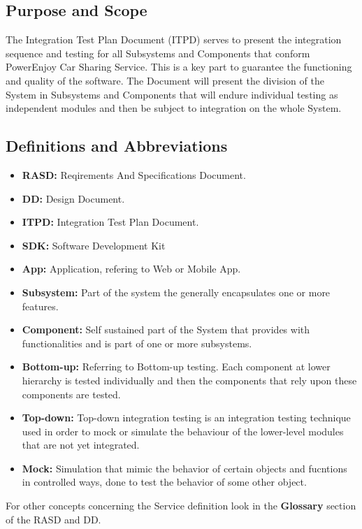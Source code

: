 \documentclass[a4paper]{article}
\begin{document}
\subsection{Purpose and Scope}
The Integration Test Plan Document (ITPD) serves to present the integration sequence and testing for all Subsystems and Components that conform PowerEnjoy Car Sharing Service. This is a key part to guarantee the functioning and quality of the software. The Document will present the division of the System in Subsystems and Components that will endure individual testing as independent modules and then be subject to integration on the whole System.

\subsection{Definitions and Abbreviations}
\begin{itemize}
\item \textbf{RASD:} Reqirements And Specifications Document.
\item \textbf{DD:} Design Document.
\item \textbf{ITPD:} Integration Test Plan Document.
\item \textbf{SDK:} Software Development Kit
\item \textbf{App:} Application, refering to Web or Mobile App.
\item \textbf{Subsystem:} Part of the system the generally encapsulates one or more features.
\item \textbf{Component:} Self sustained part of the System that provides with functionalities and is part of one or more subsystems.
\item \textbf{Bottom-up:} Referring to Bottom-up testing. Each component at lower hierarchy is tested individually and then the components that rely upon these components are tested.
\item \textbf{Top-down:} Top-down integration testing is an integration testing technique used in order to mock or simulate the behaviour of the lower-level modules that are not yet integrated.
\item \textbf{Mock:} Simulation that mimic the behavior of certain objects and fucntions in controlled ways, done to test the behavior of some other object.
\end{itemize}
For other concepts concerning the Service definition look in the \textbf{Glossary} section of the RASD and DD.
\end{document}
